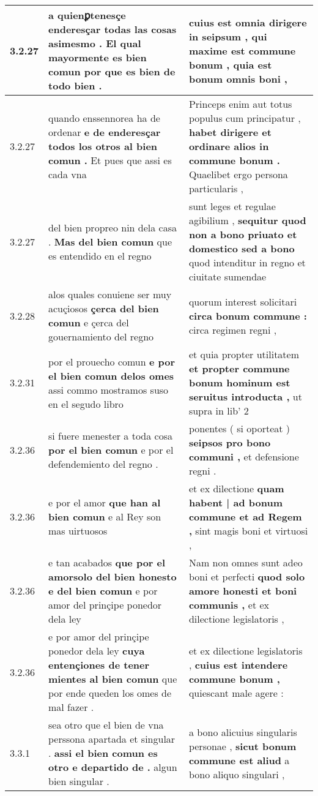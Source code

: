 \begin{tabular}{|p{1cm}|p{6.5cm}|p{6.5cm}|}
3.2.27 & a quienꝑtenesçe enderesçar todas las cosas asimesmo . \textbf{ El qual mayormente es bien comun } por que es bien de todo bien . & cuius est omnia dirigere in seipsum , \textbf{ qui maxime est commune bonum , } quia est bonum omnis boni , \\\hline
3.2.27 & quando enssennorea ha de ordenar \textbf{ e de enderesçar todos los otros al bien comun . } Et pues que assi es cada vna & Princeps enim aut totus populus cum principatur , \textbf{ habet dirigere et ordinare alios in commune bonum . } Quaelibet ergo persona particularis , \\\hline
3.2.27 & del bien propreo nin dela casa . \textbf{ Mas del bien comun } que es entendido en el regno & sunt leges et regulae agibilium , \textbf{ sequitur quod non a bono priuato et domestico sed a bono } quod intenditur in regno et ciuitate sumendae \\\hline
3.2.28 & alos quales conuiene ser muy acuçiosos \textbf{ çerca del bien comun } e çerca del gouernamiento del regno & quorum interest solicitari \textbf{ circa bonum commune : } circa regimen regni , \\\hline
3.2.31 & por el prouecho comun \textbf{ e por el bien comun delos omes } assi commo mostramos suso en el segudo libro & et quia propter utilitatem \textbf{ et propter commune bonum hominum est seruitus introducta , } ut supra in lib’ 2 \\\hline
3.2.36 & si fuere menester a toda cosa \textbf{ por el bien comun } e por el defendemiento del regno . & ponentes ( si oporteat ) \textbf{ seipsos pro bono communi , } et defensione regni . \\\hline
3.2.36 & e por el amor \textbf{ que han al bien comun } e al Rey son mas uirtuosos & et ex dilectione \textbf{ quam habent | ad bonum commune et ad Regem , } sint magis boni et virtuosi , \\\hline
3.2.36 & e tan acabados \textbf{ que por el amorsolo del bien honesto e del bien comun } e por amor del prinçipe ponedor dela ley & Nam non omnes sunt adeo boni et perfecti \textbf{ quod solo amore honesti et boni communis , } et ex dilectione legislatoris , \\\hline
3.2.36 & e por amor del prinçipe ponedor dela ley \textbf{ cuya entençiones de tener mientes al bien comun } que por ende queden los omes de mal fazer . & et ex dilectione legislatoris , \textbf{ cuius est intendere commune bonum , } quiescant male agere : \\\hline
3.3.1 & sea otro que el bien de vna perssona apartada et singular . \textbf{ assi el bien comun es otro e departido de . } algun bien singular . & a bono alicuius singularis personae , \textbf{ sicut bonum commune est aliud } a bono aliquo singulari , \\\hline

\end{tabular}
